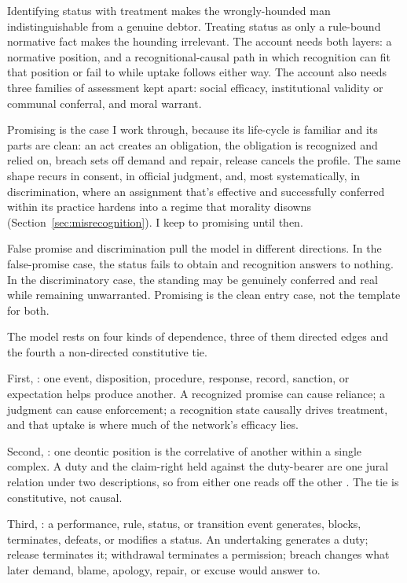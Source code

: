 \documentclass[12pt]{article}
\begin{document}
Identifying status with treatment makes the wrongly-hounded man indistinguishable from a genuine debtor. Treating status as only a rule-bound normative fact makes the hounding irrelevant. The account needs both layers: a normative position, and a recognitional-causal path in which recognition can fit that position or fail to while uptake follows either way. The account also needs three families of assessment kept apart: social efficacy, institutional validity or communal conferral, and moral warrant.

Promising is the case I work through, because its life-cycle is familiar and its parts are clean: an act creates an obligation, the obligation is recognized and relied on, breach sets off demand and repair, release cancels the profile. The same shape recurs in consent, in official judgment, and, most systematically, in discrimination, where an assignment that's effective and successfully conferred within its practice hardens into a regime that morality disowns (Section~\ref{sec:misrecognition}). I keep to promising until then.

False promise and discrimination pull the model in different directions. In the false-promise case, the status fails to obtain and recognition answers to nothing. In the discriminatory case, the standing may be genuinely conferred and real while remaining unwarranted. Promising is the clean entry case, not the template for both.

The model rests on four kinds of dependence, three of them directed edges and the fourth a non-directed constitutive tie.

First, : one event, disposition, procedure, response, record, sanction, or expectation helps produce another. A recognized promise can cause reliance; a judgment can cause enforcement; a recognition state causally drives treatment, and that uptake is where much of the network's efficacy lies.

Second, : one deontic position is the correlative of another within a single complex. A duty and the claim-right held against the duty-bearer are one jural relation under two descriptions, so from either one reads off the other \citep{hohfeld1913SomeFundamental}. The tie is constitutive, not causal.

Third, : a performance, rule, status, or transition event generates, blocks, terminates, defeats, or modifies a status. An undertaking generates a duty; release terminates it; withdrawal terminates a permission; breach changes what later demand, blame, apology, repair, or excuse would answer to.
\end{document}
